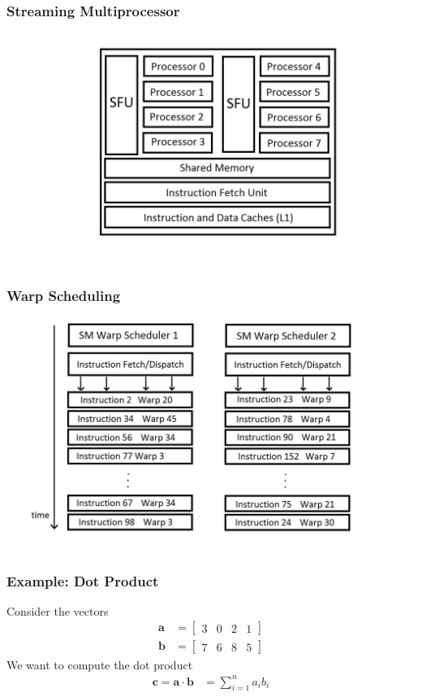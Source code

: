 \documentclass[handout]{beamer}
\begin{document}
\begin{frame}
  \frametitle{Streaming Multiprocessor}
  \centering
  \includegraphics[width=\textwidth,keepaspectratio]{Streaming-Multiprocessor}
\end{frame}

\begin{frame}
  \frametitle{Warp Scheduling}
  \centering
  \includegraphics[width=\textwidth,keepaspectratio]{Warp-Scheduler-Gpu.jpg}
\end{frame}

\begin{frame}
  \frametitle{Example: Dot Product}
  Consider the vectors
  \begin{align*}
    \boldsymbol{a} &= \begin{bmatrix} 3 & 0 & 2 & 1 \end{bmatrix} \\
    \boldsymbol{b} &= \begin{bmatrix} 7 & 6 & 8 & 5 \end{bmatrix}
  \end{align*}
  We want to compute the dot product
  \begin{align*}
    \boldsymbol{c} =
    \boldsymbol{a}\cdot\boldsymbol{b}
    & = \sum_{i=1}^n a_ib_i
  \end{align*}
\end{frame}
\end{document}

